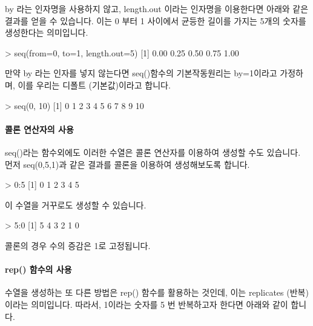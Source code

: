 \documentclass{book}
\begin{document}
by 라는 인자명을 사용하지 않고, length.out 이라는 인자명을 이용한다면 아래와 같은 결과를 얻을 수 있습니다. 
이는 0 부터 1 사이에서 균등한 길이를 가지는 5개의 숫자를 생성한다는 의미입니다. 

\begin{Schunk}
\begin{Soutput}
> seq(from=0, to=1, length.out=5)
[1] 0.00 0.25 0.50 0.75 1.00
\end{Soutput}
\end{Schunk}


만약 by 라는 인자를 넣지 않는다면 seq()함수의 기본작동원리는 by=1이라고 가정하며, 이를 우리는 디폴트 (기본값)이라고 합니다. 

\begin{Schunk}
\begin{Soutput}
> seq(0, 10)
 [1]  0  1  2  3  4  5  6  7  8  9 10	
\end{Soutput}
\end{Schunk}

\paragraph{콜론 연산자의 사용} 

seq()라는 함수외에도 이러한 수열은 콜론 연산자를 이용하여 생성할 수도 있습니다. 
먼저 seq(0,5,1)과 같은 결과를 콜론을 이용하여  생성해보도록 합니다. 

\begin{Schunk}
\begin{Soutput}
> 0:5
[1] 0 1 2 3 4 5
\end{Soutput}
\end{Schunk}

이 수열을 거꾸로도 생성할 수 있습니다. 

\begin{Schunk}
\begin{Soutput}
> 5:0
[1] 5 4 3 2 1 0	
\end{Soutput}
\end{Schunk}

콜론의 경우 수의 증감은 1로 고정됩니다.

\paragraph{rep() 함수의 사용} 

수열을 생성하는 또 다른 방법은 rep() 함수를 활용하는 것인데, 이는 replicates (반복)이라는 의미입니다.
따라서, 1이라는 숫자를 5 번 반복하고자 한다면 아래와 같이 합니다. 
\end{document}
